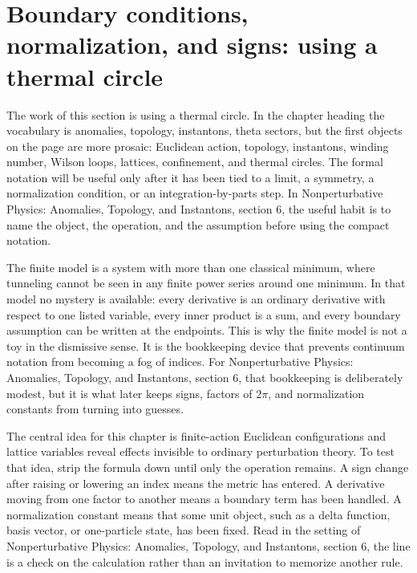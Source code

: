 \section{Boundary conditions, normalization, and signs: using a thermal circle}













The work of this section is using a thermal circle.  In the chapter heading the vocabulary is anomalies, topology, instantons, theta sectors, but the first objects on the page are more prosaic: Euclidean action, topology, instantons, winding number, Wilson loops, lattices, confinement, and thermal circles.  The formal notation will be useful only after it has been tied to a limit, a symmetry, a normalization condition, or an integration-by-parts step.  In Nonperturbative Physics: Anomalies, Topology, and Instantons, section 6, the useful habit is to name the object, the operation, and the assumption before using the compact notation.

The finite model is a system with more than one classical minimum, where tunneling cannot be seen in any finite power series around one minimum.  In that model no mystery is available: every derivative is an ordinary derivative with respect to one listed variable, every inner product is a sum, and every boundary assumption can be written at the endpoints.  This is why the finite model is not a toy in the dismissive sense.  It is the bookkeeping device that prevents continuum notation from becoming a fog of indices.  For Nonperturbative Physics: Anomalies, Topology, and Instantons, section 6, that bookkeeping is deliberately modest, but it is what later keeps signs, factors of \(2\pi\), and normalization constants from turning into guesses.

The central idea for this chapter is finite-action Euclidean configurations and lattice variables reveal effects invisible to ordinary perturbation theory.  To test that idea, strip the formula down until only the operation remains.  A sign change after raising or lowering an index means the metric has entered.  A derivative moving from one factor to another means a boundary term has been handled.  A normalization constant means that some unit object, such as a delta function, basis vector, or one-particle state, has been fixed.  Read in the setting of Nonperturbative Physics: Anomalies, Topology, and Instantons, section 6, the line is a check on the calculation rather than an invitation to memorize another rule.

